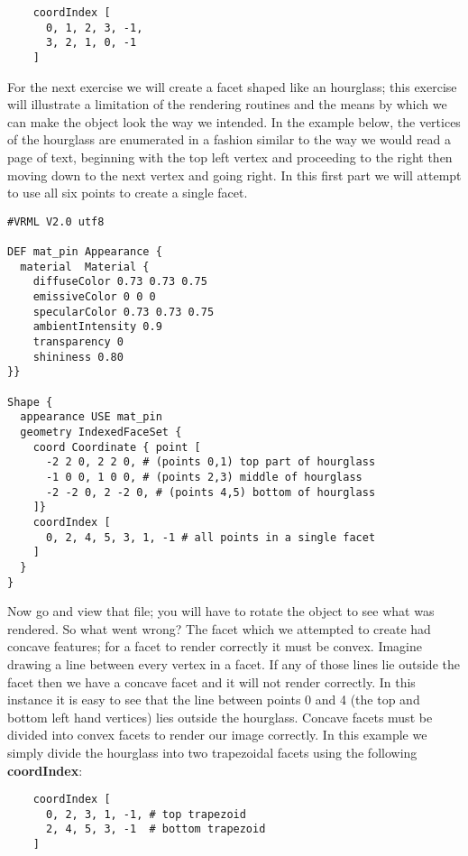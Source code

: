 \documentclass[a4paper, dvipdfm]{article}
\begin{document}
\begin{verbatim}
    coordIndex [
      0, 1, 2, 3, -1,
      3, 2, 1, 0, -1
    ]
\end{verbatim}

For the next exercise we will create a facet shaped like an hourglass; this exercise will illustrate a limitation of the rendering
routines and the means by which we can make the object look the way we intended. In the example below, the vertices of the hourglass
are enumerated in a fashion similar to the way we would read a page of text, beginning with the top left vertex and proceeding to the
right then moving down to the next vertex and going right. In this first part we will attempt to use all six points to create a single
facet.

\begin{verbatim}
#VRML V2.0 utf8

DEF mat_pin Appearance {
  material  Material {
    diffuseColor 0.73 0.73 0.75
    emissiveColor 0 0 0
    specularColor 0.73 0.73 0.75
    ambientIntensity 0.9
    transparency 0
    shininess 0.80
}}

Shape {
  appearance USE mat_pin
  geometry IndexedFaceSet {
    coord Coordinate { point [
      -2 2 0, 2 2 0, # (points 0,1) top part of hourglass
      -1 0 0, 1 0 0, # (points 2,3) middle of hourglass
      -2 -2 0, 2 -2 0, # (points 4,5) bottom of hourglass
    ]}
    coordIndex [
      0, 2, 4, 5, 3, 1, -1 # all points in a single facet
    ]
  }
}
\end{verbatim}

Now go and view that file; you will have to rotate the object to see what was rendered.  So what went wrong?
The facet which we attempted to create had concave features; for a facet to render correctly it must be convex.
Imagine drawing a line between every vertex in a facet. If any of those lines lie outside the facet then we
have a concave facet and it will not render correctly. In this instance it is easy to see that the line between
points 0 and 4 (the top and bottom left hand vertices) lies outside the hourglass. Concave facets must be
divided into convex facets to render our image correctly. In this example we simply divide the hourglass into
two trapezoidal facets using the following \textbf{coordIndex}:

\begin{verbatim}
    coordIndex [
      0, 2, 3, 1, -1, # top trapezoid
      2, 4, 5, 3, -1  # bottom trapezoid
    ]
\end{verbatim}
\end{document}
